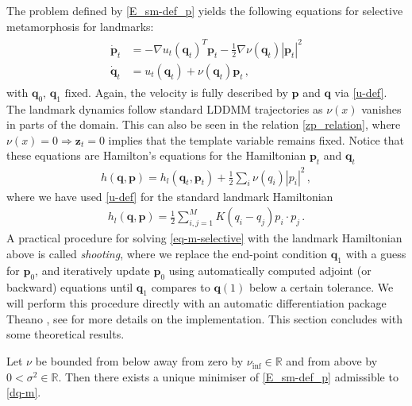 \documentclass[runningheads]{llncs}
\newcommand{\nuinf}{\nu_\text{inf}}
\begin{document}
The problem defined by \eqref{E_sm-def_p} yields the following equations for
selective metamorphosis for landmarks:
\begin{align}
  \begin{split}
  \dot{\mathbf p}_t &= - \nabla u_t(\mathbf q_t)^T \mathbf p_t - \frac12
  \nabla \nu(\mathbf q_t ) |\mathbf p_t|^2\\ \dot{\mathbf q}_t &= u_t(\mathbf q_t) +
  \nu(\mathbf q_t)\mathbf p_t \,,
\end{split}
  \label{eq-m-selective}
\end{align}
with $\mathbf q_0,\, \mathbf q_1 \text{ fixed}$. Again, the velocity is fully
described by $\mathbf p$ and $\mathbf q$ via \eqref{u-def}. The landmark
dynamics follow standard LDDMM trajectories as $\nu(x)$ vanishes in parts of the
domain.  This can also be seen in the relation \eqref{zp_relation}, where
$\nu(x)=0 \Rightarrow \mathbf z_t=0$ implies that the template variable remains
fixed. Notice that these equations are Hamilton's equations for the Hamiltonian
$\mathbf p_t$ and $\mathbf q_t$
\begin{align}
  h(\mathbf q, \mathbf p) = h_l(\mathbf q_t,\mathbf p_t)+\frac12\sum_i\nu(q_i) |p_i|^2\,,  
\end{align}
where we have used \eqref{u-def} for the standard landmark Hamiltonian
\begin{align}
  h_l(\mathbf q, \mathbf p) =  \frac12 \sum_{i,j=1}^M K(q_i-q_j)p_i\cdot p_j\, . 
\label{hamiltonian}
\end{align}
A practical procedure for solving \eqref{eq-m-selective} with the landmark
Hamiltonian above is called \emph{shooting}, where we replace the end-point
condition $\mathbf q_1$ with a guess for $\mathbf p_0$, and iteratively update
$\mathbf p_0$ using automatically computed adjoint (or backward) equations
until $\mathbf q_1$ compares to $\mathbf q(1)$ below a certain tolerance. We
will perform this procedure directly with an automatic differentiation package
Theano \cite{team2016theano}, see
\cite{kuhnel2017computational,kuhnel2017differential} for more details on the
implementation. This section concludes with some theoretical results.
\begin{theorem}\label{sm-eu}
Let $\nu$ be bounded from below away from zero by $\nuinf \in \mathbb R$ and
from above by $0<\sigma^2\in\mathbb R$. Then there exists a unique minimiser of
\eqref{E_sm-def_p} admissible to \eqref{dq-m}.
\end{theorem}
\end{document}
